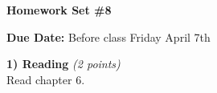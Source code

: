 

\def\xyprime{\ensuremath{\begin{pmatrix} x' \\ y' \end{pmatrix}}}



\thispagestyle{fancy}






\begin{center}
{\huge \textbf{Homework Set \#8}}
\large

{\textbf{ Due Date:} Before class Friday April 7th  }
\end{center}

\textbf{1) Reading } \hfill \textit{(2 points)}\\
Read chapter 6.

\vspace*{0.4in}

